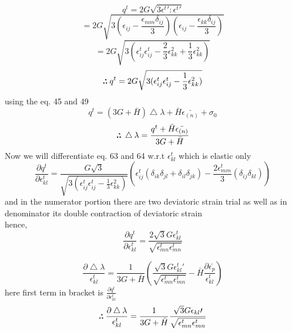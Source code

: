 \documentclass{article}
\def\therefore{\boldsymbol{\text{ }
\leavevmode
\lower0.4ex\hbox{$\cdot$}
\kern-.4em\raise0.5ex\hbox{$\cdot$}
\kern-0.55em\lower0.4ex\hbox{$\cdot$}
\thinspace\text{ }}}
\begin{document}
\begin{equation}
    q^{t}=2G\sqrt{3\epsilon^{t}\prime:\epsilon^{t}\prime}
\end{equation}
\begin{equation}
    =2G\sqrt{3(\epsilon_{ij}-\frac{\epsilon_{mm}\delta_{ij}}{3})(\epsilon_{ij}-\frac{\epsilon_{kk}\delta_{ij}}{3})}
\end{equation}
\begin{equation}
    =2G\sqrt{3(\epsilon^{t}_{ij}\epsilon^{t}_{ij}- \frac{2}{3}\epsilon^{2}_{kk} +\frac{1}{3} \epsilon^{2}_{kk})}
\end{equation}
\begin{equation}
    \therefore q^{t}=2G\sqrt{3(\epsilon^{t}_{ij}\epsilon^{t}_{ij}- \frac{1}{3}\epsilon^{2}_{kk})}
\end{equation}
using the eq. 45 and 49
\begin{equation}
    q^{t} = (3G+\bar{H})\bigtriangleup\lambda + \bar{H}\bar{\epsilon_{(n)}}+\sigma_{0}
\end{equation}
\begin{equation}
    \therefore \bigtriangleup\lambda = \frac{q^{t}+ \bar{H}\bar{\epsilon_{(n)}}}{3G+\bar{H}}
\end{equation}
Now we will differentiate eq. 63 and 64 w.r.t $\epsilon^{t}_{kl}$ which is elastic only
\begin{equation}
    \frac{\partial q^{t}}{\partial \epsilon^{t}_{kl}}=\frac{G\sqrt{3}}{\sqrt{3(\epsilon^{t}_{ij}\epsilon^{t}_{ij}- \frac{1}{3}\epsilon^{2}_{kk})}}(\epsilon^{t}_{ij}(\delta_{ik}\delta_{jl} + \delta_{il}\delta_{jk}) - \frac{2\epsilon^{t}_{mm}}{3} (\delta_{ij}\delta_{kl}))
\end{equation}
and in the numerator portion there are two deviatoric strain trial as well as in denominator its double contraction of deviatoric strain\\
hence,
\begin{equation}
    \frac{\partial q^{t}}{\partial \epsilon^{t}_{kl}}= \frac{2\sqrt{3}G \epsilon^{t}_{kl}}{\sqrt{\epsilon^{t}_{mn}\epsilon^{t}_{mn}}}
\end{equation}

\pagebreak
\begin{equation}
    \frac{\partial \bigtriangleup\lambda}{\epsilon^{t}_{kl}}= \frac{1}{3G+\bar{H}}(\frac{\sqrt{3}G\epsilon^{t}_{kl}\prime}{\sqrt{\epsilon^{t}_{mn}\epsilon^{t}_{mn}}} -\bar{H}\frac{\partial \bar{\epsilon_{p}}}{\epsilon^{t}_{kl}})
\end{equation}
here first term in bracket is $\frac{\partial q^{t}}{\partial \epsilon^{t}_{kl}}$
\begin{equation}
    \therefore  \frac{\partial \bigtriangleup\lambda}{\epsilon^{t}_{kl}}= \frac{1}{3G+\bar{H}} \frac{\sqrt{3}G\epsilon_{kl}\prime}{\sqrt{\epsilon^{t}_{mn}\epsilon^{t}_{mn}}}
\end{equation}
\end{document}
